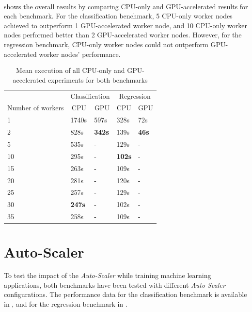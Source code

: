 \paragraph{}
 shows the overall results by comparing CPU-only and GPU-accelerated results for each benchmark.
For the classification benchmark, 5 CPU-only worker nodes achieved to outperform 1 GPU-accelerated worker node, and 10 CPU-only worker nodes performed better than 2 GPU-accelerated worker nodes.
However, for the regression benchmark, CPU-only worker nodes could not outperform GPU-accelerated worker nodes' performance.
\begin{table}[ht]
\centering
\begin{tabular}{@{}l|ll|ll@{}}
\toprule
                  & \multicolumn{2}{c|}{Classification}                & \multicolumn{2}{c}{Regression}                    \\
Number of workers & \multicolumn{1}{c}{CPU} & \multicolumn{1}{c|}{GPU} & \multicolumn{1}{c}{CPU} & \multicolumn{1}{c}{GPU} \\ \midrule
1  & 1740s         & 597s          & 328s          & 72s \\
2  & 828s          & \textbf{342s} & 139s          & \textbf{46s} \\
5  & 535s          & -             & 129s          & -     \\
10 & 295s          & -             & \textbf{102s} & -     \\
15 & 263s          & -             & 109s          & -     \\
20 & 281s          & -             & 120s          & -     \\
25 & 257s          & -             & 129s          & -     \\
30 & \textbf{247s} & -             & 102s          & -     \\
35 & 258s          & -             & 109s          & -     \\ \bottomrule
\end{tabular}
\caption{Mean execution of all CPU-only and GPU-accelerated experiments for both benchmarks}
\label{table:07_gpu_overall_results}
\end{table}


\section{Auto-Scaler}
To test the impact of the \textit{Auto-Scaler} while training machine learning applications, both benchmarks have been tested with different \textit{Auto-Scaler} configurations.
The performance data for the classification benchmark is available in , and for the regression benchmark in .


